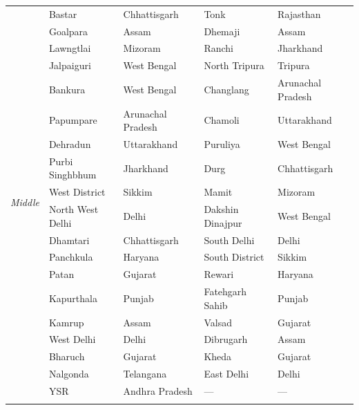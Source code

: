 \documentclass{article}        %
\begin{document}
\begin{longtable}{@{}p{2.8cm}p{3.2cm}p{3.2cm}p{3.2cm}p{3.2cm}@{}}
\multirow{19}{*}{\textit{Middle}}
  & Bastar         & Chhattisgarh        & Tonk             & Rajasthan          \\
  & Goalpara       & Assam               & Dhemaji          & Assam              \\
  & Lawngtlai      & Mizoram             & Ranchi           & Jharkhand          \\
  & Jalpaiguri     & West Bengal         & North Tripura    & Tripura            \\
  & Bankura        & West Bengal         & Changlang        & Arunachal Pradesh  \\
  & Papumpare      & Arunachal Pradesh   & Chamoli          & Uttarakhand        \\
  & Dehradun       & Uttarakhand         & Puruliya         & West Bengal        \\
  & Purbi Singhbhum & Jharkhand          & Durg             & Chhattisgarh       \\
  & West District  & Sikkim              & Mamit            & Mizoram            \\
  & North West Delhi & Delhi             & Dakshin Dinajpur & West Bengal        \\
  & Dhamtari       & Chhattisgarh        & South Delhi      & Delhi              \\
  & Panchkula      & Haryana             & South District   & Sikkim             \\
  & Patan          & Gujarat             & Rewari           & Haryana            \\
  & Kapurthala     & Punjab              & Fatehgarh Sahib  & Punjab             \\
  & Kamrup         & Assam               & Valsad           & Gujarat            \\
  & West Delhi     & Delhi               & Dibrugarh        & Assam              \\
  & Bharuch        & Gujarat             & Kheda            & Gujarat            \\
  & Nalgonda       & Telangana           & East Delhi       & Delhi              \\
  & YSR            & Andhra Pradesh      & ---              & ---                \\
\addlinespace[6pt]


\end{longtable}
\end{document}
